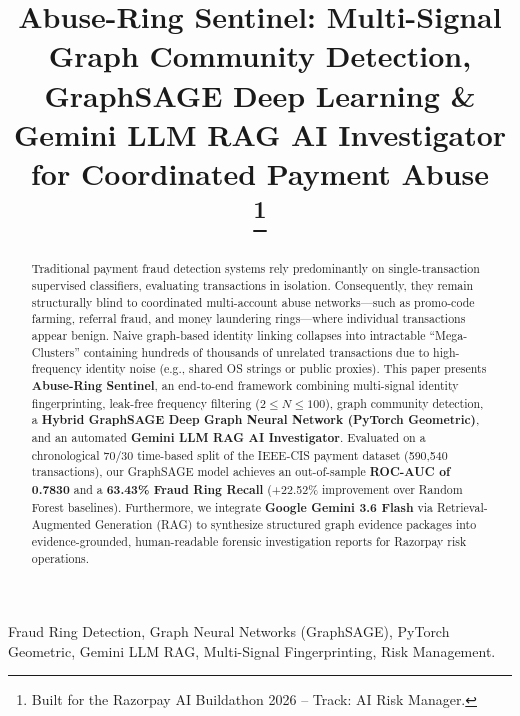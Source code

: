 \documentclass[conference]{IEEEtran}
\begin{document}
\title{Abuse-Ring Sentinel: Multi-Signal Graph Community Detection, GraphSAGE Deep Learning \& Gemini LLM RAG AI Investigator for Coordinated Payment Abuse\\
\thanks{Built for the Razorpay AI Buildathon 2026 -- Track: AI Risk Manager.}
}

\author{
}

\maketitle

\begin{abstract}
Traditional payment fraud detection systems rely predominantly on single-transaction supervised classifiers, evaluating transactions in isolation. Consequently, they remain structurally blind to coordinated multi-account abuse networks---such as promo-code farming, referral fraud, and money laundering rings---where individual transactions appear benign. Naive graph-based identity linking collapses into intractable ``Mega-Clusters'' containing hundreds of thousands of unrelated transactions due to high-frequency identity noise (e.g., shared OS strings or public proxies). This paper presents \textbf{Abuse-Ring Sentinel}, an end-to-end framework combining multi-signal identity fingerprinting, leak-free frequency filtering ($2 \le N \le 100$), graph community detection, a \textbf{Hybrid GraphSAGE Deep Graph Neural Network (PyTorch Geometric)}, and an automated \textbf{Gemini LLM RAG AI Investigator}. Evaluated on a chronological 70/30 time-based split of the IEEE-CIS payment dataset (590,540 transactions), our GraphSAGE model achieves an out-of-sample \textbf{ROC-AUC of 0.7830} and a \textbf{63.43\% Fraud Ring Recall} (+22.52\% improvement over Random Forest baselines). Furthermore, we integrate \textbf{Google Gemini 3.6 Flash} via Retrieval-Augmented Generation (RAG) to synthesize structured graph evidence packages into evidence-grounded, human-readable forensic investigation reports for Razorpay risk operations.
\end{abstract}

\begin{IEEEkeywords}
Fraud Ring Detection, Graph Neural Networks (GraphSAGE), PyTorch Geometric, Gemini LLM RAG, Multi-Signal Fingerprinting, Risk Management.
\end{IEEEkeywords}
\end{document}
